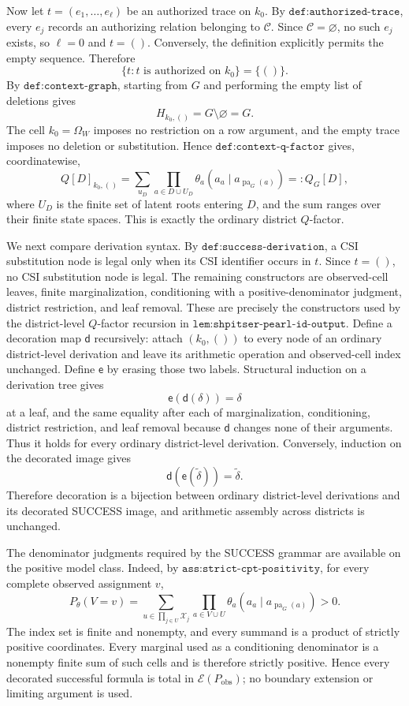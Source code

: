 Now let \(t=(e_1,\ldots,e_\ell)\) be an authorized trace on \(k_0\).  By \(\texttt{def:authorized-trace}\), every \(e_j\) records an authorizing relation belonging to \(\mathcal C\).  Since \(\mathcal C=\varnothing\), no such \(e_j\) exists, so \(\ell=0\) and \(t=()\).  Conversely, the definition explicitly permits the empty sequence.  Therefore
\[
  \{t:t\text{ is authorized on }k_0\}=\{()\}.
\]
By \(\texttt{def:context-graph}\), starting from \(G\) and performing the empty list of deletions gives
\[
  H_{k_0,()}=G\setminus\varnothing=G.
\]
The cell \(k_0=\Omega_W\) imposes no restriction on a row argument, and the empty trace imposes no deletion or substitution.  Hence \(\texttt{def:context-q-factor}\) gives, coordinatewise,
\[
  Q[D]_{k_0,()}
  =
  \sum_{u_D}
  \prod_{a\in D\cup U_D}
  \theta_a\!\left(a_a\mid a_{\operatorname{pa}_G(a)}\right)
  =:Q_G[D],
\]
where \(U_D\) is the finite set of latent roots entering \(D\), and the sum ranges over their finite state spaces.  This is exactly the ordinary district \(Q\)-factor.

We next compare derivation syntax.  By \(\texttt{def:success-derivation}\), a CSI substitution node is legal only when its CSI identifier occurs in \(t\).  Since \(t=()\), no CSI substitution node is legal.  The remaining constructors are observed-cell leaves, finite marginalization, conditioning with a positive-denominator judgment, district restriction, and leaf removal.  These are precisely the constructors used by the district-level \(Q\)-factor recursion in \(\texttt{lem:shpitser-pearl-id-output}\).  Define a decoration map \(\mathsf d\) recursively: attach \((k_0,())\) to every node of an ordinary district-level derivation and leave its arithmetic operation and observed-cell index unchanged.  Define \(\mathsf e\) by erasing those two labels.  Structural induction on a derivation tree gives
\[
  \mathsf e(\mathsf d(\delta))=\delta
\]
at a leaf, and the same equality after each of marginalization, conditioning, district restriction, and leaf removal because \(\mathsf d\) changes none of their arguments.  Thus it holds for every ordinary district-level derivation.  Conversely, induction on the decorated image gives
\[
  \mathsf d(\mathsf e(\widetilde\delta))=\widetilde\delta.
\]
Therefore decoration is a bijection between ordinary district-level derivations and its decorated SUCCESS image, and arithmetic assembly across districts is unchanged.

The denominator judgments required by the SUCCESS grammar are available on the positive model class.  Indeed, by \(\texttt{ass:strict-cpt-positivity}\), for every complete observed assignment \(v\),
\[
  P_\theta(V=v)
  =\sum_{u\in\prod_{j\in U}\mathcal X_j}
    \prod_{a\in V\cup U}
      \theta_a\!\left(a_a\mid a_{\operatorname{pa}_G(a)}\right)>0.
\]
The index set is finite and nonempty, and every summand is a product of strictly positive coordinates.  Every marginal used as a conditioning denominator is a nonempty finite sum of such cells and is therefore strictly positive.  Hence every decorated successful formula is total in \(\mathscr E(P_{\mathrm{obs}})\); no boundary extension or limiting argument is used.

